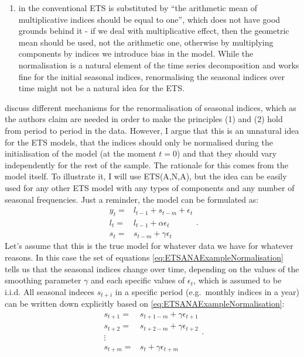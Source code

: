 \documentclass[
]{book}
\providecommand{\tightlist}{%
  \setlength{\itemsep}{0pt}\setlength{\parskip}{0pt}}
\theoremstyle{definition}
\theoremstyle{definition}
\theoremstyle{definition}
\theoremstyle{definition}
\theoremstyle{remark}
\begin{document}
\begin{enumerate}
\def\labelenumi{(\arabic{enumi})}
\setcounter{enumi}{1}
\tightlist
\item
  in the conventional ETS is substituted by ``the arithmetic mean of multiplicative indices should be equal to one'', which does not have good grounds behind it - if we deal with multiplicative effect, then the geometric mean should be used, not the arithmetic one, otherwise by multiplying components by indices we introduce bias in the model. While the normalisation is a natural element of the time series decomposition and works fine for the initial seasonal indices, renormalising the seasonal indices over time might not be a natural idea for the ETS.
\end{enumerate}

\citet{Hyndman2008b} discuss different mechanisms for the renormalisation of seasonal indices, which as the authors claim are needed in order to make the principles (1) and (2) hold from period to period in the data. However, I argue that this is an unnatural idea for the ETS models, that the indices should only be normalised during the initialisation of the model (at the moment \(t=0\)) and that they should vary independently for the rest of the sample. The rationale for this comes from the model itself. To illustrate it, I will use ETS(A,N,A), but the idea can be easily used for any other ETS model with any types of components and any number of seasonal frequencies. Just a reminder, the model can be formulated as:
\begin{equation}
  \begin{aligned}
  y_t = &l_{t-1} + s_{t-m} + \epsilon_t \\
  {l}_{t} = &l_{t-1} + \alpha\epsilon_t \\
  s_t = &s_{t-m} + \gamma\epsilon_t
  \end{aligned}.
  \label{eq:ETSANAExampleNormalisation}
\end{equation}
Let's assume that this is the true model for whatever data we have for whatever reasons. In this case the set of equations \eqref{eq:ETSANAExampleNormalisation} tells us that the seasonal indices change over time, depending on the values of the smoothing parameter \(\gamma\) and each specific values of \(\epsilon_t\), which is assumed to be i.i.d. All seasonal indeces \(s_{t+i}\) in a specific period (e.g.~monthly indices in a year) can be written down explicitly based on \eqref{eq:ETSANAExampleNormalisation}:
\begin{equation}
  \begin{aligned}
  s_{t+1} = &s_{t+1-m} + \gamma\epsilon_{t+1} \\
  s_{t+2} = &s_{t+2-m} + \gamma\epsilon_{t+2} \\
  \vdots \\
  s_{t+m} = &s_{t} + \gamma\epsilon_{t+m}
  \end{aligned}.
  \label{eq:ETSANAExampleNormalisationIndices01}
\end{equation}
\end{document}
